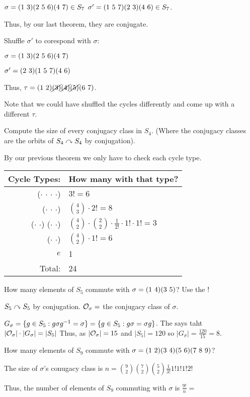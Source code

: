 \documentclass[notes.tex]{subfiles}
\begin{document}
\begin{eg}
	$\sigma = \text{(1 3)}\text{(2 5 6)}\text{(4 7)}\in S_7$
	$\sigma' = \text{(1 5 7)}\text{(2 3)}\text{(4 6)}\in S_7$.

	Thus, by our last theorem, they are conjugate.

	Shuffle $\sigma'$ to corespond with $\sigma$:

	$\sigma = \text{(1 3)}\text{(2 5 6)}\text{(4 7)}$

	$\sigma' = \text{(2 3)}\text{(1 5 7)}\text{(4 6)}$

	Thus, $\tau=\text{(1 2)}\cancel{\text{(3)}}\cancel{\text{(4)}}\cancel{\text{(5)}}\text{(6 7)}$.

	Note that we could have shuffled the cycles differently and come up with a different $\tau$.
\end{eg}

\begin{eg}
	Compute the size of every conjugacy class in $S_4.$ (Where the conjugacy classes are the orbits of $S_4\curvearrowright S_4$ by conjugation).

	By our previous theorem we only have to check each cycle type.

	\begin{tabular}{r|l}
	Cycle Types: & How many with that type?\\\hline
	($\cdot$ $\cdot$ $\cdot$ $\cdot$) & $3!=6$\\
	($\cdot$ $\cdot$ $\cdot$) & $\binom43\cdot 2! = 8$\\
	($\cdot$ $\cdot$) ($\cdot$ $\cdot$) & $\binom42\cdot\binom22\cdot\frac{1}{2!} \cdot 1!\cdot 1! = 3$\\
	($\cdot$ $\cdot$) & $\binom42\cdot 1! = 6$\\
	$e$ & 1\\
	Total: & 24
	\end{tabular}
\end{eg}

\begin{eg}
	How many elements of $S_5$ commute with $\sigma = \text{(1 4)}\text{(3 5)}$?
	Use the !

	$S_5\curvearrowright S_5$ by conjugation.
	$\mathcal{O}_\sigma = $ the conjugacy class of $\sigma.$

	$G_\sigma = \{g\in S_5 : g\sigma{g}^{-1} = \sigma\} = \{g\in S_5 : g\sigma = \sigma g\}$.
	The  says taht $|\mathcal{O}_\sigma|\cdot|G_\sigma| = |S_5|$ Thus, as $|\mathcal{O}_\sigma| = 15$ and $|S_5| = 120$ so $|G_\sigma| = \frac{120}{15} = 8$.

\end{eg}

\begin{eg}
	How many elements of $S_9$ commute with $\sigma = \text{(1 2)}\text{(3 4)}\text{(5 6)}\text{(7 8 9)}$?

	The size of $\sigma$'s conugacy class is $ n =\binom92\binom72\binom52\frac{1}{3!}1!1!1!2!$

	Thus, the number of elements of $S_9$ commuting with $\sigma$ is $\frac{9!}{n} = $
\end{eg}
\end{document}
